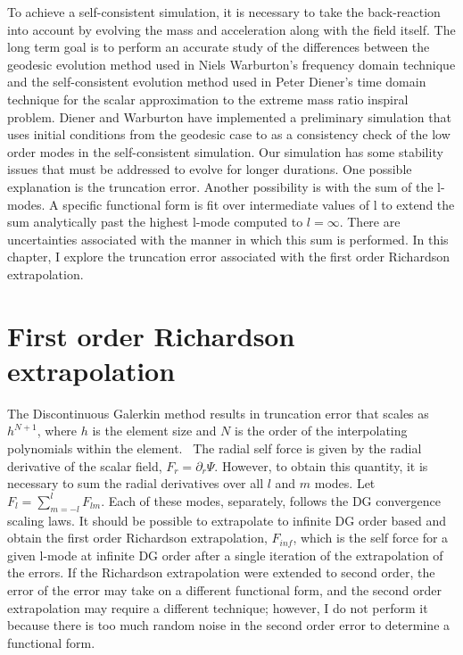 To achieve a self-consistent simulation, it is necessary to take the back-reaction into account by evolving the mass and acceleration along with the field itself. The long term goal is to perform an accurate study of the differences between the geodesic evolution method used in Niels Warburton's frequency domain technique and the self-consistent evolution method used in Peter Diener's time domain technique for the scalar approximation to the extreme mass ratio inspiral problem. Diener and Warburton have implemented a preliminary simulation that uses initial conditions from the geodesic case to as a consistency check of the low order modes in the self-consistent simulation. Our simulation has some stability issues that must be addressed to evolve for longer durations. One possible explanation is the truncation error. Another possibility is with the sum of the l-modes. A specific functional form is fit over intermediate values of l to extend the sum analytically past the highest l-mode computed to $l=\infty$. There are uncertainties associated with the manner in which this sum is performed. In this chapter, I explore the truncation error associated with the first order Richardson extrapolation.

\section{First order Richardson extrapolation}

The Discontinuous Galerkin method results in truncation error that scales as $h^{N+1}$, where $h$ is the element size and $N$ is the order of the interpolating polynomials within the element.~\cite{dghesthaven} The radial self force is given by the radial derivative of the scalar field, $F_r=\partial_r\Psi$. However, to obtain this quantity, it is necessary to sum the radial derivatives over all $l$ and $m$ modes. Let $F_l=\sum_{m=-l}^l F_{lm}$. Each of these modes, separately, follows the DG convergence scaling laws. It should be possible to extrapolate to infinite DG order based and obtain the first order Richardson extrapolation, $F_{inf}$, which is the self force for a given l-mode at infinite DG order after a single iteration of the extrapolation of the errors. If the Richardson extrapolation were extended to second order, the error of the error may take on a different functional form, and the second order extrapolation may require a different technique; however, I do not perform it because there is too much random noise in the second order error to determine a functional form.

